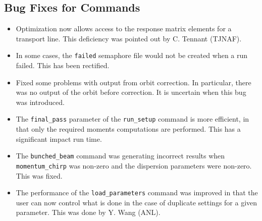 \documentclass[11pt]{article}
\begin{document}
\subsection{Bug Fixes for Commands}
\begin{itemize}
\item Optimization now allows access to the response matrix elements for a transport line.  This deficiency was pointed
  out by C. Tennant (TJNAF).
\item In some cases, the {\tt failed} semaphore file would not be created when a run failed.  This has been rectified.
\item Fixed some problems with output from orbit correction.  In particular, there was no output of the orbit before
  correction.  It is uncertain when this bug was introduced.
\item The \verb|final_pass| parameter of the \verb|run_setup| command is more efficient, in that only the required
  moments computations are performed.  This has a significant impact run time.
\item The \verb|bunched_beam| command was generating incorrect results when \verb|momentum_chirp| was non-zero and
  the dispersion parameters were non-zero.  This was fixed.
\item The performance of the \verb|load_parameters| command was improved in that the user can now control what is
  done in the case of duplicate settings for a given parameter.  This was done by Y. Wang (ANL).
\end{itemize}
\end{document}

